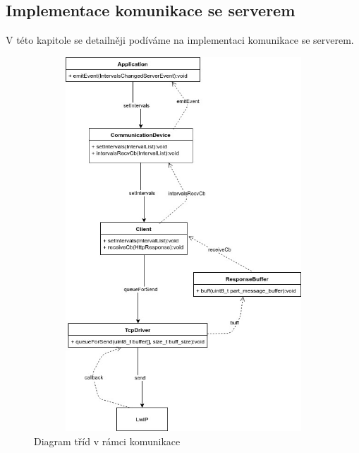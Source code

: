 
\subsection{Implementace komunikace se serverem}
V této kapitole se detailněji podíváme na implementaci komunikace se serverem.

\begin{figure}[tbh]\centering
\includegraphics[width=140mm, height=140mm]{../diagrams/stm_implementace_komunikace.jpg}
\caption{Diagram tříd v rámci komunikace}
\label{stm-implementace-komunikace}
\end{figure}


